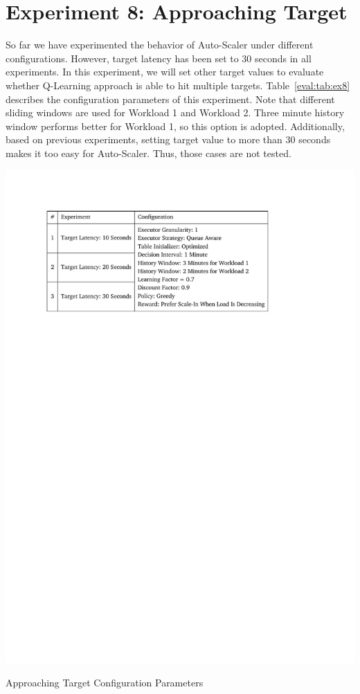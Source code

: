 \section{Experiment 8: Approaching Target}
So far we have experimented the behavior of Auto-Scaler under different configurations. However, target latency has been set to 30 seconds in all experiments. In this experiment, we will set other target values to evaluate whether Q-Learning approach is able to hit multiple targets. Table~\ref{eval:tab:ex8} describes the configuration parameters of this experiment. Note that different sliding windows are used for Workload 1 and Workload 2. Three minute history window performs better for Workload 1, so this option is adopted. Additionally, based on previous experiments, setting target value to more than 30 seconds makes it too easy for Auto-Scaler. Thus, those cases are not tested. 
\begin{table}[h]
    \includegraphics[clip,trim=2.4cm 21.18cm 5.1cm 2.5cm]{tables/ex8.pdf}
    \centering
    \caption{Approaching Target Configuration Parameters}
    \label{eval:tab:ex8}
\end{table}

